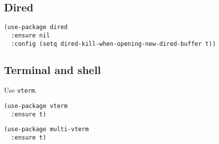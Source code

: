 \documentclass[a4paper,11pt]{article}
\begin{document}
\subsection{Dired}
\label{sec:orga03259c}
\begin{verbatim}
(use-package dired
  :ensure nil
  :config (setq dired-kill-when-opening-new-dired-buffer t))
\end{verbatim}

\subsection{Terminal and shell}
\label{sec:orgc26871e}
Use \texttt{vterm}.
\begin{verbatim}
(use-package vterm
  :ensure t)
\end{verbatim}

\begin{verbatim}
(use-package multi-vterm
  :ensure t)
\end{verbatim}
\end{document}
